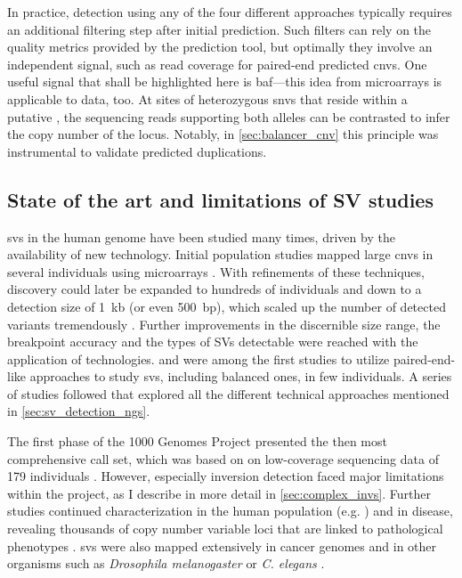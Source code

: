 In practice, \sv detection using any of the four different approaches typically
requires an additional filtering step after initial \sv prediction. Such
filters can rely on the quality metrics provided by the prediction tool, but
optimally they involve an independent signal, such as read coverage for
paired-end predicted \acp{cnv}. One useful signal that shall be highlighted here
is \acl{baf}---this idea from microarrays is applicable to \mps data,
too. At sites of heterozygous \acp{snv} that reside within a putative \sv, the
sequencing reads supporting both alleles can be contrasted to infer the copy
number of the locus. Notably, in \cref{sec:balancer_cnv} this principle was
instrumental to validate predicted duplications.





\subsection{State of the art and limitations of SV studies}
\label{sec:limitations}

\Aclp{sv} in the human genome have been studied many times, driven by the
availability of new technology. Initial population studies mapped large \acp{cnv}
in several individuals using microarrays \citep{Sebat2004,Iafrate2004,Sharp2005,Redon2006}.
With refinements of these techniques, \cnv discovery could later be expanded to
hundreds of individuals and down to a detection size of 1~kb (or even 500~bp),
which scaled up the number of detected variants tremendously
\citep{McCarroll2008,Conrad2010}. Further improvements in the discernible size
range, the breakpoint accuracy and the types of SVs detectable were reached
with the application of \mps technologies. \citet{Korbel2007} and \citet{Kidd2008}
were among the first studies to utilize paired-end-like approaches to study
\acp{sv}, including balanced ones, in few individuals. A series of studies
followed that explored all the different technical approaches mentioned in
\cref{sec:sv_detection_ngs}.

The first phase of the 1000 Genomes Project presented the then most
comprehensive \sv call set, which was based on on low-coverage sequencing data
of 179 individuals \citep{Mills2011}. However, especially inversion detection
faced major limitations within the project, as I describe in more detail in
\cref{sec:complex_invs}. Further studies continued \sv characterization in the
human population (e.g. \citep{Sudmant2015a,Hehir-Kwa2016}) and in disease,
revealing thousands of copy number variable loci that are linked to pathological
phenotypes \citep{Swaminathan2012,Forbes2011}. \Acp{sv} were also mapped extensively in
cancer genomes \citep{Weischenfeldt2016,Campbell2017} and in other organisms such
as \textit{Drosophila melanogaster} \citep{Massouras2012,Zichner2013} or
\textit{C. elegans} \citep{Maydan2010}.

